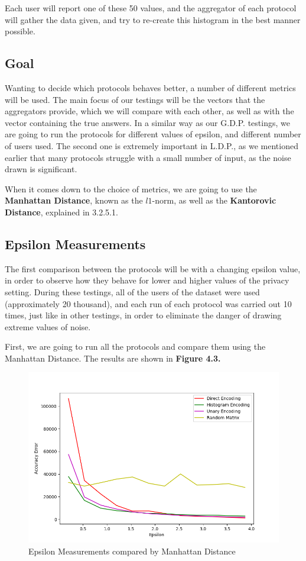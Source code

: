Each user will report one of these 50 values, and the aggregator of each protocol will gather the data given, and try to re-create this histogram in the best manner possible.

\subsection{Goal}

Wanting to decide which protocols behaves better, a number of different metrics will be used. The main focus of our testings will be the vectors that the aggregators provide, which we will compare with each other, as well as with the vector containing the true answers. In a similar way as our G.D.P. testings, we are going to run the protocols for different values of epsilon, and different number of users used. The second one is extremely important in L.D.P., as we mentioned earlier that many protocols struggle with a small number of input, as the noise drawn is significant. 

When it comes down to the choice of metrics, we are going to use the \textbf{Manhattan Distance}, known as the $l1$-norm, as well as the \textbf{Kantorovic Distance}, explained in 3.2.5.1.

\subsection{Epsilon Measurements}

The first comparison between the protocols will be with a changing epsilon value, in order to observe how they behave for lower and higher values of the privacy setting. During these testings, all of the users of the dataset were used (approximately 20 thousand), and each run of each protocol was carried out 10 times, just like in other testings, in order to eliminate the danger of drawing extreme values of noise.

First, we are going to run all the protocols and compare them using the Manhattan Distance. The results are shown in \textbf{Figure 4.3.}


\begin{figure}[!htb]\centering
    \includegraphics[width=1\textwidth]{images/epsilon_others_l1.png}
    \caption{Epsilon Measurements compared by Manhattan Distance}
\end{figure}



